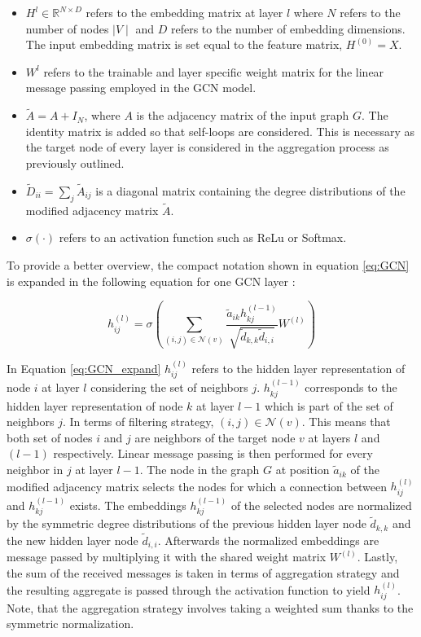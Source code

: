 	\begin{itemize}
		\setlength\itemsep{0.2em}
		\item $H^{l}\in\mathbb{R}^{N \times D}$ refers to the embedding matrix
			at layer $l$ where $N$ refers to the number of nodes $\mid V \mid$
			and $D$ refers to the number of embedding dimensions. The input
			embedding matrix is set equal to the feature matrix, $H^{(0)}=X$.
		\item $W^{l}$ refers to the trainable and layer specific weight matrix
			for the linear message passing employed in the GCN model.
		\item $\tilde A = A + I_N$, where $A$ is the adjacency matrix of the
			input graph $G$. The identity matrix is added so that self-loops
			are considered. This is necessary as the target node of every layer
			is considered in the aggregation process as previously outlined.
		\item $\tilde D_{ii} = \sum_{j}\tilde A_{ij}$ is a diagonal matrix
			containing the degree distributions of the modified adjacency
			matrix $\tilde A$.
		\item $\sigma(\cdot)$ refers to an activation function such as ReLu or
			Softmax.
	\end{itemize}

	\noindent To provide a better overview, the compact notation shown in 
	equation \ref{eq:GCN} is expanded in the following equation for one GCN
	layer \citep{Dubois2019}:

	\begin{equation}
		h_{ij}^{(l)} = \sigma\left(\sum_{(i,j)\in
		\mathcal{N}(v)}\frac{\tilde a_{ik}h_{kj}^{(l-1)}}{\sqrt{\tilde
d_{k,k}\tilde d_{i,i}}} W^{(l)}\right)
		\label{eq:GCN_expand}
	\end{equation}
	
	\noindent In Equation \ref{eq:GCN_expand} $h_{ij}^{(l)}$ refers to the 
	hidden layer representation of node $i$ at layer $l$ considering the set of
	neighbors $j$. $h_{kj}^{(l-1)}$ corresponds to the hidden layer
	representation of node $k$ at layer $l-1$ which is part of the set of 
	neighbors $j$. In terms of filtering strategy, $(i,j) \in \mathcal{N}(v)$. 
	This means that both set of nodes $i$ and $j$ are neighbors of the target 
	node $v$ at layers $l$ and $(l-1)$ respectively. Linear message
	passing is then performed for every neighbor in $j$ at layer $l-1$. The node 
	in the graph $G$ at position $\tilde a_{ik}$ of the modified adjacency matrix 
	selects the nodes for which a connection between $h_{ij}^{(l)}$ and
	$h_{kj}^{(l-1)}$ exists. The embeddings $h_{kj}^{(l-1)}$ of the selected 
	nodes are normalized by the symmetric degree distributions of the previous 
	hidden layer node $\tilde d_{k,k}$ and the new hidden layer node $\tilde d_{i,i}$.
	Afterwards the normalized embeddings are message passed by multiplying it
	with the shared weight matrix $W^{(l)}$. Lastly, the sum of the received
	messages is taken in terms of aggregation strategy and the resulting
	aggregate is passed through the activation function to yield $h_{ij}^{(l)}$.
	Note, that the aggregation strategy involves taking a weighted sum thanks
	to the symmetric normalization. \\

